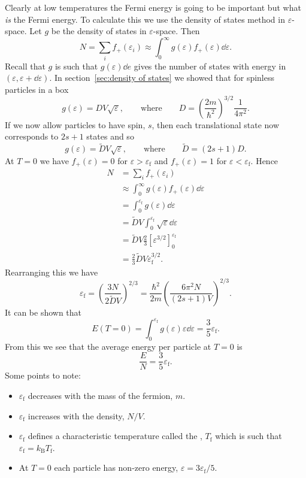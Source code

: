 \documentclass[a4paper]{article}
\newcommand{\boltzmann}{k_\mathrm{B}}
\newcommand{\fermiEnergy}{\varepsilon_{\mathrm{f}}}
\newcommand{\fermiTemp}{T_{\mathrm{f}}}
\begin{document}
    Clearly at low temperatures the Fermi energy is going to be important but what \emph{is} the Fermi energy.
    To calculate this we use the density of states method in \(\varepsilon\)-space.
    Let \(g\) be the density of states in \(\varepsilon\)-space.
    Then
    \[N = \sum_i f_{+}(\varepsilon_i) \approx \int_{0}^{\infty} g(\varepsilon) f_{+}(\varepsilon) \dd{\varepsilon}.\]
    Recall that \(g\) is such that \(g(\varepsilon)\dd{e}\) gives the number of states with energy in \((\varepsilon, \varepsilon + \dd{\varepsilon})\).
    In section~\ref{sec:density of states} we showed that for spinless particles in a box
    \[g(\varepsilon) = DV\sqrt{\varepsilon}, \qquad\text{where}\qquad D = \left( \frac{2m}{\hbar^2} \right)^{3/2}\frac{1}{4\pi^2}.\]
    If we now allow particles to have spin, \(s\), then each translational state now corresponds to \(2s + 1\) states and so
    \[g(\varepsilon) = \tilde{D}V\sqrt{\varepsilon}, \qquad\text{where}\qquad \tilde{D} = (2s + 1)D.\]
    At \(T = 0\) we have \(f_{+}(\varepsilon) = 0\) for \(\varepsilon > \fermiEnergy\) and \(f_{+}(\varepsilon) = 1\) for \(\varepsilon < \fermiEnergy\).
    Hence
    \begin{align*}
        N &= \sum_{i} f_{+}(\varepsilon_{i})\\
        &\approx \int_{0}^{\infty} g(\varepsilon)f_{+}(\varepsilon) \dd{\varepsilon}\\
        &= \int_{0}^{\fermiEnergy} g(\varepsilon)\dd{\varepsilon}\\
        &= \tilde{D}V \int_{0}^{\fermiEnergy} \sqrt{\varepsilon}\dd{\varepsilon}\\
        &= \tilde{D}V \frac{2}{3}\left[ \varepsilon^{3/2} \right]_{0}^{\fermiEnergy}\\
        &= \frac{2}{3}\tilde{D}V\fermiEnergy^{3/2}.
    \end{align*}
    Rearranging this we have
    \[\fermiEnergy = \left( \frac{3N}{2\tilde{D}V} \right)^{2/3} = \frac{\hbar^2}{2m}\left( \frac{6\pi^2N}{(2s + 1)V} \right)^{2/3}.\]
    It can be shown that
    \[E(T = 0) = \int_{0}^{\fermiEnergy}g(\varepsilon)\varepsilon\dd{\varepsilon} = \frac{3}{5}\fermiEnergy.\]
    From this we see that the average energy per particle at \(T = 0\) is
    \[\frac{E}{N} = \frac{3}{5}\fermiEnergy.\]
    Some points to note:
    \begin{itemize}
        \item \(\fermiEnergy\) decreases with the mass of the fermion, \(m\).
        \item \(\fermiEnergy\) increases with the density, \(N/V\).
        \item \(\fermiEnergy\) defines a characteristic temperature called the , \(\fermiTemp\) which is such that \(\fermiEnergy = \boltzmann \fermiTemp\).
        \item At \(T = 0\) each particle has non-zero energy, \(\varepsilon = 3\fermiEnergy/5\).
    \end{itemize}
    
\end{document}
